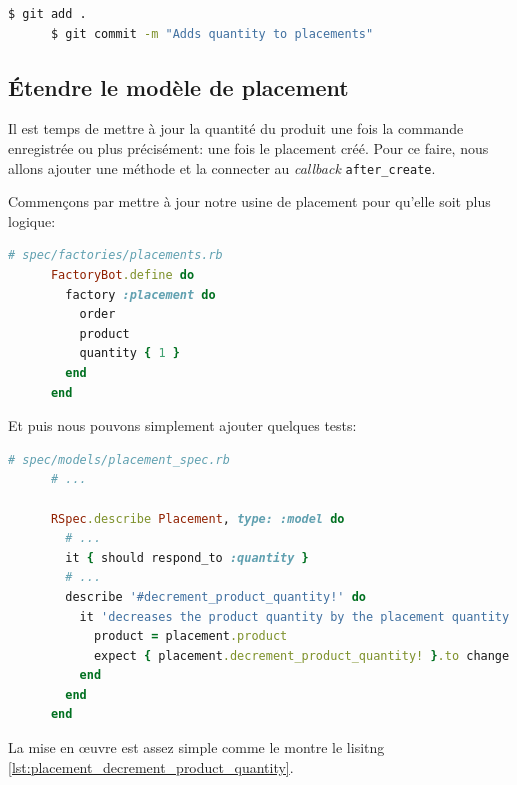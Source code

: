 \documentclass[]{report}
\begin{document}
    \begin{scriptsize}
      \begin{lstlisting}[language=bash]
      $ git add .
      $ git commit -m "Adds quantity to placements"
      \end{lstlisting}
    \end{scriptsize}

    \subsection{Étendre le modèle de placement}

    Il est temps de mettre à jour la quantité du produit une fois la commande enregistrée ou plus précisément: une fois le placement créé. Pour ce faire, nous allons ajouter une méthode et la connecter au \textit{callback} \verb|after_create|.

    Commençons par mettre à jour notre usine de placement pour qu'elle soit plus logique:

    \begin{scriptsize}
      \begin{lstlisting}[language=ruby, caption={Mise à jour de l'usine des placements}]
      # spec/factories/placements.rb
      FactoryBot.define do
        factory :placement do
          order
          product
          quantity { 1 }
        end
      end
      \end{lstlisting}
    \end{scriptsize}

    Et puis nous pouvons simplement ajouter quelques tests:

    \begin{scriptsize}
      \begin{lstlisting}[language=ruby, caption={Test de la mise à jour de la quantité des produits}]
      # spec/models/placement_spec.rb
      # ...

      RSpec.describe Placement, type: :model do
        # ...
        it { should respond_to :quantity }
        # ...
        describe '#decrement_product_quantity!' do
          it 'decreases the product quantity by the placement quantity' do
            product = placement.product
            expect { placement.decrement_product_quantity! }.to change { product.quantity }.by(-placement.quantity)
          end
        end
      end
      \end{lstlisting}
    \end{scriptsize}

    La mise en œuvre est assez simple comme le montre le lisitng \ref{lst:placement_decrement_product_quantity}.
\end{document}
